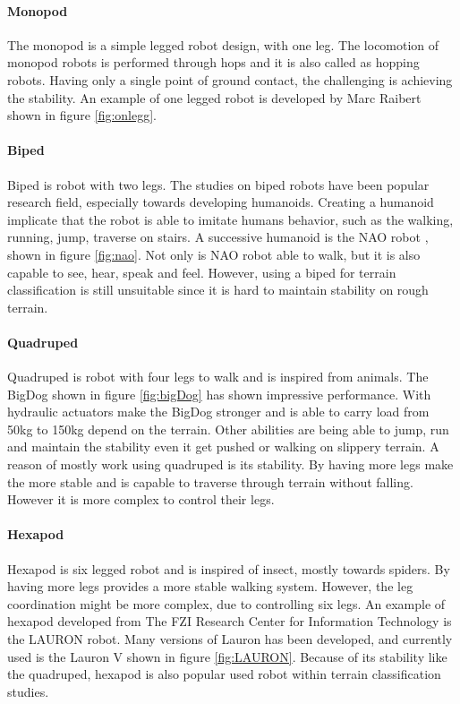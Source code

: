 \documentclass[USenglish]{ifimaster}  %
\begin{document}
\paragraph{Monopod}
The monopod is a simple legged robot design, with one leg. The locomotion of monopod robots is performed through hops and it is also called as hopping robots. Having only a single point of ground contact, the challenging is achieving the stability. An example of one legged robot is developed by Marc Raibert shown in figure \ref{fig:onlegg}.
	
	
\paragraph{Biped}
Biped is robot with two legs. The studies on biped robots have been popular research field, especially towards developing humanoids. Creating a humanoid implicate that the robot is able to imitate humans behavior, such as the walking, running, jump, traverse on stairs. A successive humanoid is the NAO robot \cite{NAO}, shown in figure \ref{fig:nao}. Not only is NAO robot able to walk, but it is also capable to see, hear, speak and feel. However, using a biped for terrain classification is still unsuitable since it is hard to maintain stability on rough terrain.
	
\paragraph{Quadruped}
Quadruped is robot with four legs to walk and is inspired from animals. The BigDog \cite{Raibert200810822} shown in figure \ref{fig:bigDog} has shown impressive performance. With hydraulic actuators make the BigDog stronger and is able to carry load from 50kg to 150kg depend on the terrain. Other abilities are being able to jump, run and maintain the stability even it get pushed or walking on slippery terrain. A reason of mostly work using quadruped is its stability. By having more legs make the more stable and is capable to traverse through terrain without falling. However it is more complex to control their legs.

\paragraph{Hexapod}
Hexapod is six legged robot and is inspired of insect, mostly towards spiders. By having more legs provides a more stable walking system. However, the leg coordination might be more complex, due to controlling six legs. An example of hexapod developed from The FZI Research Center for Information Technology is the LAURON robot. Many versions of Lauron has been developed, and currently used is the Lauron V shown in figure \ref{fig:LAURON}. Because of its stability like the quadruped, hexapod is also popular used robot within terrain classification studies.
	
\end{document}
